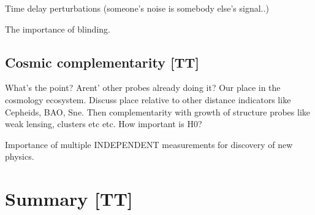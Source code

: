 Time delay perturbations (someone's noise is somebody else's signal..)

The importance of blinding.


\subsection{Cosmic complementarity [TT]}

What's the point? Arent' other probes already doing it? Our place in the cosmology ecosystem. Discuss place relative to other distance indicators like Cepheids, BAO, Sne. Then complementarity with growth of structure probes like weak lensing, clusters etc etc. How important is H0?

Importance of multiple INDEPENDENT measurements for discovery of new physics.


\section{Summary [TT]}
\label{sec:summary}



